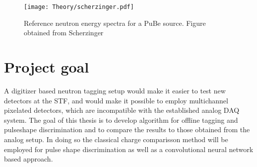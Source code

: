 \documentclass[main.tex]{subfiles}
\begin{document}
\begin{figure}[t]
    \centering
        \texttt{[image: Theory/scherzinger.pdf]}
        \caption[Reference neutron energy spectrum]{Reference neutron energy spectra for a PuBe source. Figure obtained from Scherzinger\cite{ScherzingerPhd}}
    \label{fig:scherzinger} 
\end{figure}

\section{Project goal}
A digitizer based neutron tagging setup would make it easier to test new detectors at the STF, and would make it possible to employ multichannel pixelated detectors, which are incompatible with the established analog DAQ system. The goal of this thesis is to develop algorithm for offline tagging and pulseshape discrimination and to compare the results to those obtained from the analog setup. In doing so the classical charge comparisson method will be employed for pulse shape discrimination as well as a convolutional neural network based approach.
\end{document}
